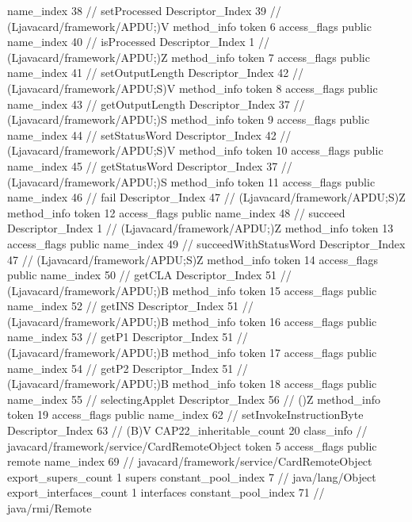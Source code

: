 {{{{{					name_index	38		// setProcessed
					Descriptor_Index	39		// (Ljavacard/framework/APDU;)V
				}
				method_info {
					token	6
					access_flags	public
					name_index	40		// isProcessed
					Descriptor_Index	1		// (Ljavacard/framework/APDU;)Z
				}
				method_info {
					token	7
					access_flags	public
					name_index	41		// setOutputLength
					Descriptor_Index	42		// (Ljavacard/framework/APDU;S)V
				}
				method_info {
					token	8
					access_flags	public
					name_index	43		// getOutputLength
					Descriptor_Index	37		// (Ljavacard/framework/APDU;)S
				}
				method_info {
					token	9
					access_flags	public
					name_index	44		// setStatusWord
					Descriptor_Index	42		// (Ljavacard/framework/APDU;S)V
				}
				method_info {
					token	10
					access_flags	public
					name_index	45		// getStatusWord
					Descriptor_Index	37		// (Ljavacard/framework/APDU;)S
				}
				method_info {
					token	11
					access_flags	public
					name_index	46		// fail
					Descriptor_Index	47		// (Ljavacard/framework/APDU;S)Z
				}
				method_info {
					token	12
					access_flags	public
					name_index	48		// succeed
					Descriptor_Index	1		// (Ljavacard/framework/APDU;)Z
				}
				method_info {
					token	13
					access_flags	public
					name_index	49		// succeedWithStatusWord
					Descriptor_Index	47		// (Ljavacard/framework/APDU;S)Z
				}
				method_info {
					token	14
					access_flags	public
					name_index	50		// getCLA
					Descriptor_Index	51		// (Ljavacard/framework/APDU;)B
				}
				method_info {
					token	15
					access_flags	public
					name_index	52		// getINS
					Descriptor_Index	51		// (Ljavacard/framework/APDU;)B
				}
				method_info {
					token	16
					access_flags	public
					name_index	53		// getP1
					Descriptor_Index	51		// (Ljavacard/framework/APDU;)B
				}
				method_info {
					token	17
					access_flags	public
					name_index	54		// getP2
					Descriptor_Index	51		// (Ljavacard/framework/APDU;)B
				}
				method_info {
					token	18
					access_flags	public
					name_index	55		// selectingApplet
					Descriptor_Index	56		// ()Z
				}
				method_info {
					token	19
					access_flags	public
					name_index	62		// setInvokeInstructionByte
					Descriptor_Index	63		// (B)V
				}
			}
			CAP22_inheritable_count	20
		}
		class_info {		// javacard/framework/service/CardRemoteObject
			token	5
			access_flags	public remote
			name_index	69		// javacard/framework/service/CardRemoteObject
			export_supers_count	1
			supers {
				constant_pool_index	7		// java/lang/Object
			}
			export_interfaces_count	1
			interfaces {
				constant_pool_index	71		// java/rmi/Remote
}}}}
